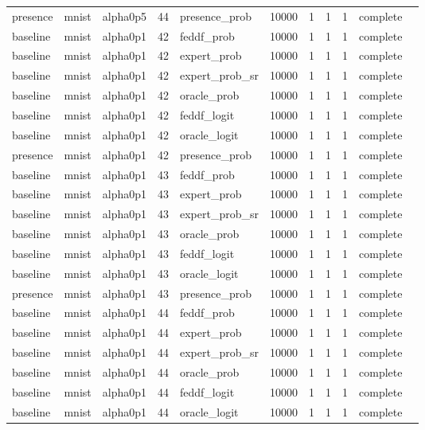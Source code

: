 \begin{tabular}{lllrlrrrrll}
presence & mnist & alpha0p5 & 44 & presence\_prob & 10000 & 1 & 1 & 1 & complete &  \\
baseline & mnist & alpha0p1 & 42 & feddf\_prob & 10000 & 1 & 1 & 1 & complete &  \\
baseline & mnist & alpha0p1 & 42 & expert\_prob & 10000 & 1 & 1 & 1 & complete &  \\
baseline & mnist & alpha0p1 & 42 & expert\_prob\_sr & 10000 & 1 & 1 & 1 & complete &  \\
baseline & mnist & alpha0p1 & 42 & oracle\_prob & 10000 & 1 & 1 & 1 & complete &  \\
baseline & mnist & alpha0p1 & 42 & feddf\_logit & 10000 & 1 & 1 & 1 & complete &  \\
baseline & mnist & alpha0p1 & 42 & oracle\_logit & 10000 & 1 & 1 & 1 & complete &  \\
presence & mnist & alpha0p1 & 42 & presence\_prob & 10000 & 1 & 1 & 1 & complete &  \\
baseline & mnist & alpha0p1 & 43 & feddf\_prob & 10000 & 1 & 1 & 1 & complete &  \\
baseline & mnist & alpha0p1 & 43 & expert\_prob & 10000 & 1 & 1 & 1 & complete &  \\
baseline & mnist & alpha0p1 & 43 & expert\_prob\_sr & 10000 & 1 & 1 & 1 & complete &  \\
baseline & mnist & alpha0p1 & 43 & oracle\_prob & 10000 & 1 & 1 & 1 & complete &  \\
baseline & mnist & alpha0p1 & 43 & feddf\_logit & 10000 & 1 & 1 & 1 & complete &  \\
baseline & mnist & alpha0p1 & 43 & oracle\_logit & 10000 & 1 & 1 & 1 & complete &  \\
presence & mnist & alpha0p1 & 43 & presence\_prob & 10000 & 1 & 1 & 1 & complete &  \\
baseline & mnist & alpha0p1 & 44 & feddf\_prob & 10000 & 1 & 1 & 1 & complete &  \\
baseline & mnist & alpha0p1 & 44 & expert\_prob & 10000 & 1 & 1 & 1 & complete &  \\
baseline & mnist & alpha0p1 & 44 & expert\_prob\_sr & 10000 & 1 & 1 & 1 & complete &  \\
baseline & mnist & alpha0p1 & 44 & oracle\_prob & 10000 & 1 & 1 & 1 & complete &  \\
baseline & mnist & alpha0p1 & 44 & feddf\_logit & 10000 & 1 & 1 & 1 & complete &  \\
baseline & mnist & alpha0p1 & 44 & oracle\_logit & 10000 & 1 & 1 & 1 & complete &  \\

\end{tabular}
